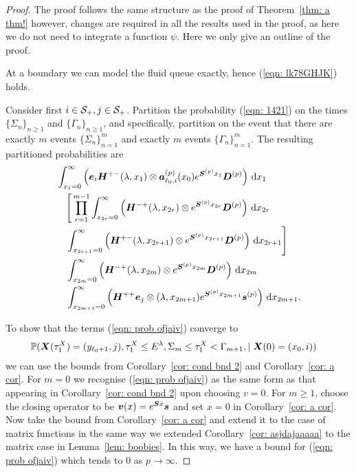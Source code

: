 \begin{proof}
	The proof follows the same structure as the proof of Theorem~\ref{thm: a thm!} however, changes are required in all the results used in the proof, as here we do not need to integrate a function \(\psi\). Here we only give an outline of the proof. 

	At a boundary we can model the fluid queue exactly, hence (\ref{eqn: lk78GHJK}) holds.

	Consider first \(i\in \mathcal{S}_+,j\in\mathcal{S}_+\). Partition the probability (\ref{eqn: 1421}) on the times \(\{\Sigma_n\}_{n\geq 1}\) and \(\{\Gamma_n\}_{n\geq 1}\), and specifically, partition on the event that there are exactly \(m\) events \(\{\Sigma_n\}_{n=1}^m\) and exactly \(m\) events \(\{\Gamma_n\}_{n=1}^m\). 
	The resulting partitioned probabilities are
	\begin{align}
                 &\int_{x_1=0}^\infty \left(\boldsymbol e_i\boldsymbol H^{+-}(\lambda,x_1)\otimes \boldsymbol a_{\ell_0,i}^{(p)}(x_0)e^{\boldsymbol{S}^{(p)}x_1}\boldsymbol{D}^{(p)}\right)\, \mathrm{d} x_1 \nonumber
            	\\&\nonumber \quad \Bigg[\prod_{r=1}^{m-1} \int_{x_{2r}=0}^\infty \left(\boldsymbol H^{-+}(\lambda,x_{2r}) \otimes e^{\boldsymbol{S}^{(p)}x_{2r}}\boldsymbol D^{(p)}\right)\, \mathrm{d} x_{2r} \\&\quad \int_{x_{2r+1}=0}^\infty \left(\boldsymbol H^{+-}(\lambda,x_{2r+1}) \otimes e^{\boldsymbol{S}^{(p)}x_{2r+1}}\boldsymbol D^{(p)}\right) \, \mathrm{d} x_{2r+1}\Bigg] \nonumber
            	\\&
            	\quad \int_{x_{2m}=0}^\infty \left(\boldsymbol H^{-+}(\lambda, x_{2m}) \otimes e^{\boldsymbol{S}^{(p)}x_{2m}}\boldsymbol{D}^{(p)}\right) \, \mathrm{d} x_{2m} \nonumber
				\\&\quad \int_{x_{2m+1}=0}^\infty \left( \boldsymbol H^{++}\boldsymbol e_j \otimes (\lambda,x_{2m+1}) e^{\boldsymbol{S}^{(p)}x_{2m+1}}\boldsymbol s^{(p)} \right) \, \mathrm{d} x_{2m+1}.  \label{eqn: prob ofjaiv}
	\end{align}

	To show that the terms (\ref{eqn: prob ofjaiv}) converge to 
	\begin{align}
		&\mathbb P(\boldsymbol X(\tau_1^X)=(y_{\ell_0+1},j),\tau_1^X\leq E^\lambda, \Sigma_{m}\leq \tau_1^X<\Gamma_{m+1}, \mid \boldsymbol X(0)=(x_0, i))
	\end{align}
	we can use the bounds from Corollary~\ref{cor: cond bnd 2} and Corollary~\ref{cor: a cor}. For \(m=0\) we recognise (\ref{eqn: prob ofjaiv}) as the same form as that appearing in Corollary~\ref{cor: cond bnd 2} upon choosing \(v=0\). For \(m\geq 1\), choose the closing operator to be \(\boldsymbol v(x)=e^{\boldsymbol S x}\boldsymbol s\) and set \(x=0\) in Corollary~\ref{cor: a cor}. Now take the bound from Corollary~\ref{cor: a cor} and extend it to the case of matrix functions in the same way we extended Corollary~\ref{cor: asjdajaaaaa} to the matrix case in Lemma~\ref{lem: boobies}. In this way, we have a bound for (\ref{eqn: prob ofjaiv}) which tends to \(0\) as \(p\to\infty\).


\end{proof}
